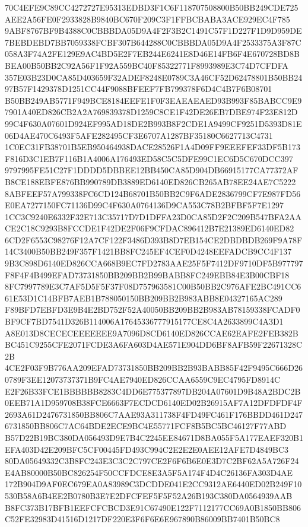 \documentclass[UTF8,fontset=fandol,zihao=-4,a4paper]{ctexart}
\begin{document}
{{70C4EFE9C89CC4272727E95313EDBD3F1C6F118707508800B50BB249CDE725AEE2A56FE0F2933828B9840BC670F209C3F1FFBCBABA3ACE929EC4F785
9ABF8767BF9B4388C0CBBBDA05D9A4F2F3B2C1491C57F1D227F1D9D959DE7BEBDEBD7BB7059338FCBF307B644288C0CBBBDA05D9A4F2533375A3F87C
058A3F74A2FE129E9AC4BD5E2F7EB244E6241E8D46E14FB6F4E670728BD8BBEA00B50BB2C92A56F1F92A559BC40F85322771F8993989E3C74D7CFDFA
357E03B23D0CA85D403659F32ADEF8248E0789C3A46CF52D62478801B50BB2497B57F1429378D1251CC44F9088BFEEF7FB799378F6D4C4B7F6B08701
B50BB249AB5771F949BCE8184EEFE1F0F3EAEAEAED93B993F85BABCC9E97901A40ED826CB2A2A769839378D1259C8CE1F42DE26EB7DBE974F23E812D
99C4F630A07601D924EF995AD18DE2B993B8F2CDE1A9499CF9251D5393D81E06D4AE470C6493F5AFE282495CF3E6707A1287BF35180C6627713C4731
1C0EC31FB38701B5EB950464938DACE28526F1A4D09FF9EEEFEF33DF5B173F816D3C1EB7F116B1A4006A176493ED58C5C5DFE99C1EC6D5C670DCC397
9797995FE51C27F1DDDD5DBBEE12BB450CA85D904DB66915177CA77372AFB8CE188EBFE876BB990789DB3889ED6140ED826CB265AB78EE24AE7C5222
8ABFEEF57A799338FC6CD124B68701B50BB2C9F6ADE2836799CF7E987FD56E0EA7277150FC71136D99C4F630A0764136D9CA553C78B2BFBF5F7E1297
1CC3C9240E6332F32E713C35717D7D1DFFA23D0CA85D2F2C209B547BFA2AACE2C18C9293B8FCCDE1F42DE2F06F9CFDAC896412B7E21389ED6140ED82
6CD2F6553C98276F12A7CF122F3486D393B8D7EB154CE2DBDBDB269F9A78F14C3400B50BB249F357F1421BB8FC245EF4CEF0D4248EEFADCB9CC4F137
9B3C898D6140ED826CCA668B9EC7FD2783AAE25F5F7412DF9710DF5B977797F8F4F4B499EFAD73731850BB209BB2B99BABB8FC249EBB84E3B00CBF18
8FC7997789E3C7AF5D5F5F37F08D757963581C00B50BB2C976AFE2BC491CC661E53D1C14BFB7AEB1B788050150BB209BB2B983ABB8E04327165AC289
F89BFD7EBFD3E9B4E2BD752F52A40050BB209BB2B983AB78159338FCADF0BF9CF7BD7541D326B114006A17645336777915177CE8C4A2633899C4A3D1
A8E013D8CECECEEEEEEE9A7096D8CD6140ED826CCAE62EAFE2FEB382BBC451C9255CFE2071FCDE3A6FA603D4AE571E904DD6BF8AFB59F22671328C2B
4CE2F03F9B776AA209EFAD73731850BB209BB2B93BABB85F42F9495C666D260789F3EE12073737371B9FC4AE7940ED826CCAA6559C9EC4795FD8914C
E2F26B33FCE1BBBBBB8283C4DD6E775377897DB204A07601D9B48A2BDC2B0EEB71A1D959708B38FCE6663F7ECDCD6140ED02B26915AF7A12DFDFDF4F
2693A61D2476731850BB806C7AAE93A311738F4FD49FC461F176BBDD461D2476731850BB806C7AC64BDE2ECE9BC4E55771FCF8B5BC5BC46127F77ABD
B57D22B19BC380DA056493D9E7B4C2245EE84671D8BA055F5A177EAEF320B1EFA403D42E209BFC5CF00445FD493C994C2E2E2E0AEE12AFE7D4849BC3
80DA05649332C3B8FC243E3C3C2C797CE2F6F6B6E0E3D7C2BF62A5A726F24E4AB80000B50BC826254F50CCFDCE8E3A5F5A174F4D4C26136FA303D4AE
172B904D9AF0EC679EA0A83989C3DCDDE041E2CC9312AE6440ED02B249F10530B58A6B4EE2B0780B3E7E2DFCFEF5F5F52A26B193C380DA0564939AAB
B8FC373B17BFB1EEFCFCBCD3E91C67490E122F7112177CC69A0B1850BB806C52FE32983D41516D1217DF220E3F6F6E6E967890B86009BB7401B50BC8
}}
\end{document}
